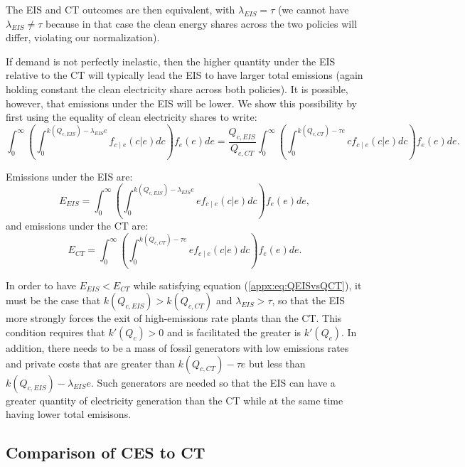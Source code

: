 \documentclass[12pt]{article}
\begin{document}
The EIS and CT outcomes are then equivalent, with $\lambda_{EIS}=\tau$ (we cannot have $\lambda_{EIS}\neq\tau$ because in that case the clean energy shares across the two policies will differ, violating our normalization).

If demand is not perfectly inelastic, then the higher quantity under the EIS relative to the CT will typically lead the EIS to have larger total emissions (again holding constant the clean electricity share across both policies). It is possible, however, that emissions under the EIS will be lower. We show this possibility by first using the equality of clean electricity shares to write:
\begin{equation}
    \int_0^\infty\left(\int_0^{k(Q_{c,EIS})-\lambda_{EIS}e}f_{c\mid e}(c|e)dc\right)f_e(e)de = \frac{Q_{c,EIS}}{Q_{c,CT}} \int_0^\infty\left(\int_0^{k(Q_{c,CT}) - \tau e}cf_{c\mid e}(c|e)dc\right)f_e(e)de. \label{appx:eq:QEISvsQCT}
\end{equation}

Emissions under the EIS are:
\begin{equation}
    E_{EIS}=\int_0^\infty\left(\int_0^{k(Q_{c,EIS})-\lambda_{EIS}e}ef_{c\mid e}(c|e)dc\right)f_e(e)de, \label{appx:eq:EISemissions}
\end{equation}
\noindent and emissions under the CT are:
\begin{equation}
    E_{CT}=\int_0^\infty\left(\int_0^{k(Q_{c,CT}) - \tau e}ef_{c\mid e}(c|e)dc\right)f_e(e)de. \label{appx:eq:CTemissions}
\end{equation}

In order to have $E_{EIS}<E_{CT}$ while satisfying equation (\ref{appx:eq:QEISvsQCT}), it must be the case that $k(Q_{c,EIS})>k(Q_{c,CT})$ and $\lambda_{EIS}>\tau$, so that the EIS more strongly forces the exit of high-emissions rate plants than the CT. This condition requires that $k'(Q_c)>0$ and is facilitated the greater is $k'(Q_c)$. In addition, there needs to be a mass of fossil generators with low emissions rates and private costs that are greater than $k(Q_{c,CT}) - \tau e$ but less than $k(Q_{c,EIS})-\lambda_{EIS}e$. Such generators are needed so that the EIS can have a greater quantity of electricity generation than the CT while at the same time having lower total emisisons.



\subsection*{Comparison of CES to CT}
\end{document}
